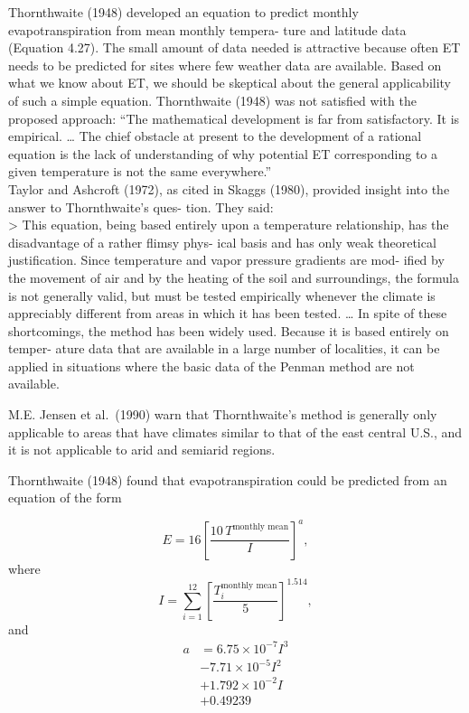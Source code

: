 \documentclass[
  letterpaper,
  DIV=11,
  numbers=noendperiod]{scrreprt}
\begin{document}
Thornthwaite (1948) developed an equation to predict monthly
evapotranspiration from mean monthly tempera- ture and latitude data
(Equation 4.27). The small amount of data needed is attractive because
often ET needs to be predicted for sites where few weather data are
available. Based on what we know about ET, we should be skeptical about
the general applicability of such a simple equation. Thornthwaite (1948)
was not satisfied with the proposed approach: ``The mathematical
development is far from satisfactory. It is empirical. \ldots{} The
chief obstacle at present to the development of a rational equation is
the lack of understanding of why potential ET corresponding to a given
temperature is not the same everywhere.''\\
Taylor and Ashcroft (1972), as cited in Skaggs (1980), provided insight
into the answer to Thornthwaite's ques- tion. They said:\\
\textgreater{} This equation, being based entirely upon a temperature
relationship, has the disadvantage of a rather flimsy phys- ical basis
and has only weak theoretical justification. Since temperature and vapor
pressure gradients are mod- ified by the movement of air and by the
heating of the soil and surroundings, the formula is not generally
valid, but must be tested empirically whenever the climate is
appreciably different from areas in which it has been tested. \ldots{}
In spite of these shortcomings, the method has been widely used. Because
it is based entirely on temper- ature data that are available in a large
number of localities, it can be applied in situations where the basic
data of the Penman method are not available.

M.E. Jensen et al.~(1990) warn that Thornthwaite's method is generally
only applicable to areas that have climates similar to that of the east
central U.S., and it is not applicable to arid and semiarid regions.

Thornthwaite (1948) found that evapotranspiration could be predicted
from an equation of the form

\[
\begin{equation}
E = 16\left[ \frac{10\,T^\text{monthly mean}}{I} \right]^a,
\end{equation}
\] where \[
\begin{equation}
I = \sum_{i=1}^{12} \left[ \frac{T_i^\text{monthly mean}}{5} \right]^{1.514},
\end{equation}
\] and \[
\begin{align}
a &= 6.75\times 10^{-7}I^3 \\
   &- 7.71\times 10^{-5}I^2 \nonumber\\
   &+ 1.792\times 10^{-2}I \nonumber\\
   &+ 0.49239 \nonumber
\end{align}
\]
\end{document}
